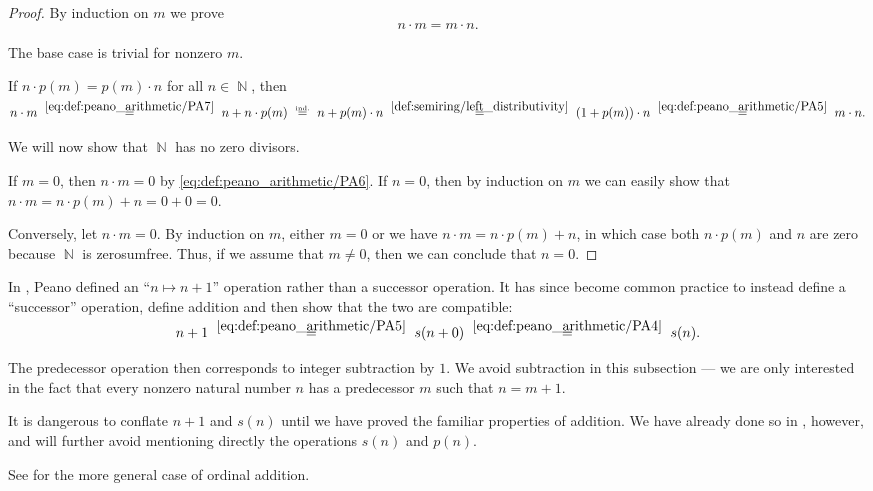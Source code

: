\begin{proof}
   By induction on \( m \) we prove
  \begin{equation*}
    n \cdot m = m \cdot n.
  \end{equation*}

  The base case is trivial for nonzero \( m \).

  If \( n \cdot p(m) = p(m) \cdot n \) for all \( n \in \BbbN \), then
  \begin{equation*}
    n \cdot m
    \reloset{\eqref{eq:def:peano_arithmetic/PA7}} =
    n + n \cdot p(m)
    \reloset {\T{ind.}} =
    n + p(m) \cdot n
    \reloset{\eqref{def:semiring/left_distributivity}} =
    (1 + p(m)) \cdot n
    \reloset{\eqref{eq:def:peano_arithmetic/PA5}} =
    m \cdot n.
  \end{equation*}

   We will now show that \( \BbbN \) has no zero divisors.

  If \( m = 0 \), then \( n \cdot m = 0 \) by \eqref{eq:def:peano_arithmetic/PA6}. If \( n = 0 \), then by induction on \( m \) we can easily show that \( n \cdot m = n \cdot p(m) + n = 0 + 0 = 0 \).

  Conversely, let \( n \cdot m = 0 \). By induction on \( m \), either \( m = 0 \) or we have \( n \cdot m = n \cdot p(m) + n \), in which case both \( n \cdot p(m) \) and \( n \) are zero because \( \BbbN \) is zerosumfree. Thus, if we assume that \( m \neq 0 \), then we can conclude that \( n = 0 \).
\end{proof}

\begin{remark}\label{rem:natural_number_successor_via_addition}
  In \cite[1]{Peano1889}, Peano defined an \enquote{\( n \mapsto n + 1 \)} operation rather than a successor operation. It has since become common practice to instead define a \enquote{successor} operation, define addition and then show that the two are compatible:
  \begin{equation*}
    n + 1
    \reloset {\eqref{eq:def:peano_arithmetic/PA5}} =
    s(n + 0)
    \reloset {\eqref{eq:def:peano_arithmetic/PA4}} =
    s(n).
  \end{equation*}

  The predecessor operation then corresponds to integer subtraction by \( 1 \). We avoid subtraction in this subsection --- we are only interested in the fact that every nonzero natural number \( n \) has a predecessor \( m \) such that \( n = m + 1 \).

  It is dangerous to conflate \( n + 1 \) and \( s(n) \) until we have proved the familiar properties of addition. We have already done so in , however, and will further avoid mentioning directly the operations \( s(n) \) and \( p(n) \).

  See  for the more general case of ordinal addition.
\end{remark}


